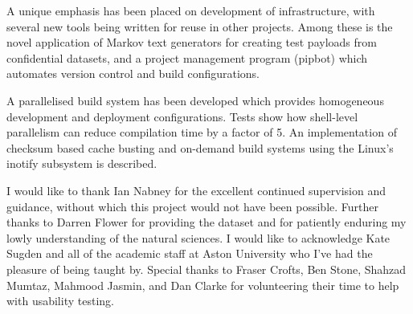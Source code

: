 A unique emphasis has been placed on development of infrastructure,
with several new tools being written for reuse in other
projects. Among these is the novel application of Markov text
generators for creating test payloads from confidential datasets, and
a project management program (pipbot) which automates version control
and build configurations.

A parallelised build system has been developed which provides
homogeneous development and deployment configurations. Tests show how
shell-level parallelism can reduce compilation time by a factor of
5. An implementation of checksum based cache busting and on-demand
build systems using the Linux's inotify subsystem is described.




I would like to thank Ian Nabney for the excellent continued
supervision and guidance, without which this project would not have
been possible. Further thanks to Darren Flower for providing the
dataset and for patiently enduring my lowly understanding of the
natural sciences. I would like to acknowledge Kate Sugden and all of
the academic staff at Aston University who I've had the pleasure of
being taught by. Special thanks to Fraser Crofts, Ben Stone, Shahzad
Mumtaz, Mahmood Jasmin, and Dan Clarke for volunteering their time to
help with usability testing.
